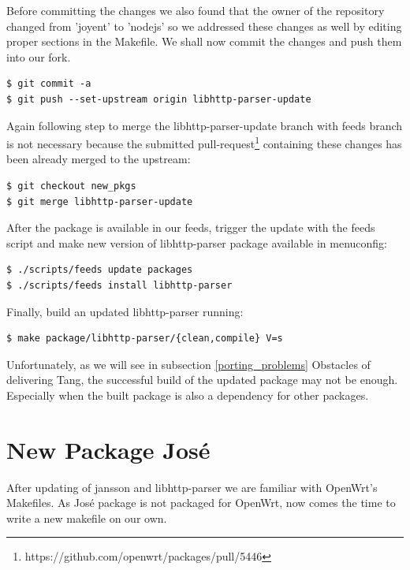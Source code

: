 Before committing the changes we also found that the owner of the repository changed from 'joyent' to 'nodejs' so we addressed these changes as well by editing proper sections in the Makefile.
We shall now commit the changes and push them into our fork.
\begin{lstlisting}[columns=fixed,basicstyle=\ttfamily\footnotesize,tabsize=4,backgroundcolor=\color{yellow!10}]
$ git commit -a
$ git push --set-upstream origin libhttp-parser-update
\end{lstlisting}
Again following step to merge the libhttp-parser-update branch with feeds branch is not necessary because the submitted pull-request\footnote{https://github.com/openwrt/packages/pull/5446} containing these changes has been already merged to the upstream:
\begin{lstlisting}[columns=fixed,basicstyle=\ttfamily\footnotesize,tabsize=4,backgroundcolor=\color{yellow!10}]
$ git checkout new_pkgs
$ git merge libhttp-parser-update
\end{lstlisting}
After the package is available in our feeds, trigger the update with the feeds script and make new version of libhttp-parser package available in menuconfig:
\begin{lstlisting}[columns=fixed,basicstyle=\ttfamily\footnotesize,tabsize=4,backgroundcolor=\color{yellow!10}]
$ ./scripts/feeds update packages
$ ./scripts/feeds install libhttp-parser
\end{lstlisting}
Finally, build an updated libhttp-parser running:
\begin{lstlisting}[columns=fixed,basicstyle=\ttfamily\footnotesize,tabsize=4,backgroundcolor=\color{yellow!10}]
$ make package/libhttp-parser/{clean,compile} V=s
\end{lstlisting}
Unfortunately, as we will see in subsection \ref{porting_problems} Obstacles of delivering Tang, the successful build of the updated package may not be enough.
Especially when the built package is also a dependency for other packages.



\section{New Package José}

After updating of jansson and libhttp-parser we are familiar with OpenWrt's Makefiles.
As José package is not packaged for OpenWrt, now comes the time to write a new makefile on our own.

